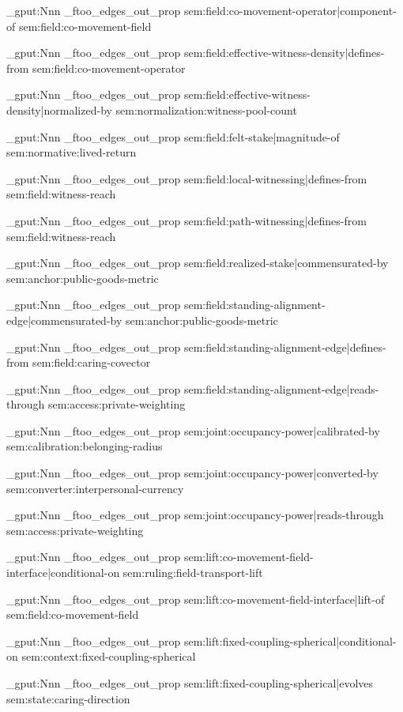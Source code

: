 \prop_gput:Nnn \g_ftoo_edges_out_prop { sem:field:co-movement-operator|component-of } { sem:field:co-movement-field }

\prop_gput:Nnn \g_ftoo_edges_out_prop { sem:field:effective-witness-density|defines-from } { sem:field:co-movement-operator }

\prop_gput:Nnn \g_ftoo_edges_out_prop { sem:field:effective-witness-density|normalized-by } { sem:normalization:witness-pool-count }

\prop_gput:Nnn \g_ftoo_edges_out_prop { sem:field:felt-stake|magnitude-of } { sem:normative:lived-return }

\prop_gput:Nnn \g_ftoo_edges_out_prop { sem:field:local-witnessing|defines-from } { sem:field:witness-reach }

\prop_gput:Nnn \g_ftoo_edges_out_prop { sem:field:path-witnessing|defines-from } { sem:field:witness-reach }

\prop_gput:Nnn \g_ftoo_edges_out_prop { sem:field:realized-stake|commensurated-by } { sem:anchor:public-goods-metric }

\prop_gput:Nnn \g_ftoo_edges_out_prop { sem:field:standing-alignment-edge|commensurated-by } { sem:anchor:public-goods-metric }

\prop_gput:Nnn \g_ftoo_edges_out_prop { sem:field:standing-alignment-edge|defines-from } { sem:field:caring-covector }

\prop_gput:Nnn \g_ftoo_edges_out_prop { sem:field:standing-alignment-edge|reads-through } { sem:access:private-weighting }

\prop_gput:Nnn \g_ftoo_edges_out_prop { sem:joint:occupancy-power|calibrated-by } { sem:calibration:belonging-radius }

\prop_gput:Nnn \g_ftoo_edges_out_prop { sem:joint:occupancy-power|converted-by } { sem:converter:interpersonal-currency }

\prop_gput:Nnn \g_ftoo_edges_out_prop { sem:joint:occupancy-power|reads-through } { sem:access:private-weighting }

\prop_gput:Nnn \g_ftoo_edges_out_prop { sem:lift:co-movement-field-interface|conditional-on } { sem:ruling:field-transport-lift }

\prop_gput:Nnn \g_ftoo_edges_out_prop { sem:lift:co-movement-field-interface|lift-of } { sem:field:co-movement-field }

\prop_gput:Nnn \g_ftoo_edges_out_prop { sem:lift:fixed-coupling-spherical|conditional-on } { sem:context:fixed-coupling-spherical }

\prop_gput:Nnn \g_ftoo_edges_out_prop { sem:lift:fixed-coupling-spherical|evolves } { sem:state:caring-direction }

